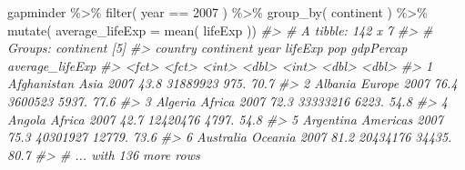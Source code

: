 \documentclass[
]{book}
\newenvironment{Shaded}{\begin{snugshade}}{\end{snugshade}}
\newcommand{\AttributeTok}[1]{\textcolor[rgb]{0.77,0.63,0.00}{#1}}
\newcommand{\CommentTok}[1]{\textcolor[rgb]{0.56,0.35,0.01}{\textit{#1}}}
\newcommand{\DecValTok}[1]{\textcolor[rgb]{0.00,0.00,0.81}{#1}}
\newcommand{\FunctionTok}[1]{\textcolor[rgb]{0.00,0.00,0.00}{#1}}
\newcommand{\NormalTok}[1]{#1}
\newcommand{\SpecialCharTok}[1]{\textcolor[rgb]{0.00,0.00,0.00}{#1}}
\begin{document}
\begin{Shaded}
\begin{Highlighting}[]
\NormalTok{gapminder }\SpecialCharTok{\%\textgreater{}\%}
  \FunctionTok{filter}\NormalTok{( year }\SpecialCharTok{==} \DecValTok{2007}\NormalTok{ ) }\SpecialCharTok{\%\textgreater{}\%}
  \FunctionTok{group\_by}\NormalTok{( continent ) }\SpecialCharTok{\%\textgreater{}\%}
  \FunctionTok{mutate}\NormalTok{( }\AttributeTok{average\_lifeExp =} \FunctionTok{mean}\NormalTok{( lifeExp ))}
\CommentTok{\#\textgreater{} \# A tibble: 142 x 7}
\CommentTok{\#\textgreater{} \# Groups:   continent [5]}
\CommentTok{\#\textgreater{}   country     continent  year lifeExp      pop gdpPercap average\_lifeExp}
\CommentTok{\#\textgreater{}   \textless{}fct\textgreater{}       \textless{}fct\textgreater{}     \textless{}int\textgreater{}   \textless{}dbl\textgreater{}    \textless{}int\textgreater{}     \textless{}dbl\textgreater{}           \textless{}dbl\textgreater{}}
\CommentTok{\#\textgreater{} 1 Afghanistan Asia       2007    43.8 31889923      975.            70.7}
\CommentTok{\#\textgreater{} 2 Albania     Europe     2007    76.4  3600523     5937.            77.6}
\CommentTok{\#\textgreater{} 3 Algeria     Africa     2007    72.3 33333216     6223.            54.8}
\CommentTok{\#\textgreater{} 4 Angola      Africa     2007    42.7 12420476     4797.            54.8}
\CommentTok{\#\textgreater{} 5 Argentina   Americas   2007    75.3 40301927    12779.            73.6}
\CommentTok{\#\textgreater{} 6 Australia   Oceania    2007    81.2 20434176    34435.            80.7}
\CommentTok{\#\textgreater{} \# ... with 136 more rows}
\end{Highlighting}
\end{Shaded}
\end{document}
